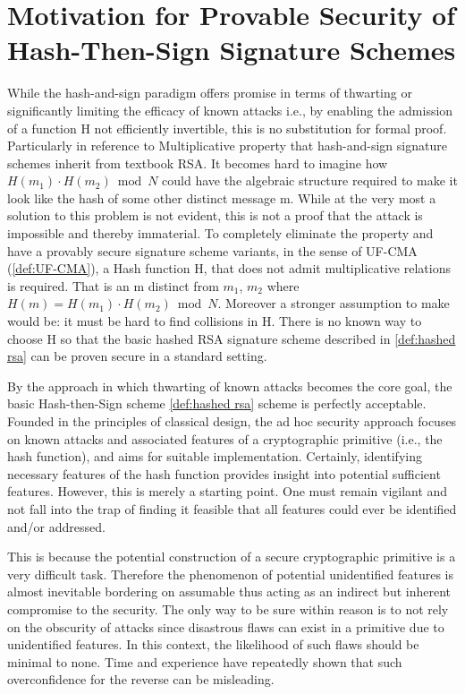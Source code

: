 \documentclass[]{final_report}
\theoremstyle{definition}
\begin{document}
\section{Motivation for Provable Security of Hash-Then-Sign Signature Schemes}
While the hash-and-sign paradigm offers promise in terms of thwarting or significantly limiting the efficacy of known attacks i.e., by enabling the admission of a function H not efficiently invertible, this is no substitution for formal proof. Particularly in reference to Multiplicative property that hash-and-sign signature schemes inherit from textbook RSA. 
It becomes hard to imagine how $H(m_{1}) \cdot H(m_{2}) \bmod N$ could have the algebraic structure required to make it look like the hash of some other distinct message m. While at the very most a solution to this problem is not evident, this is not a proof that the attack is impossible and thereby immaterial. 
To completely eliminate the property and have a provably secure signature scheme variants, in the sense of UF-CMA (\ref{def:UF-CMA}), a Hash function H, that does not admit multiplicative relations is required. That is an m distinct from $m_{1}$, $m_{2}$ where $H(m) = H(m_{1}) \cdot H(m_{2}) \bmod N$. Moreover a stronger assumption to make would be: it must be hard to find collisions in H. There is no known way to choose H so that the basic hashed RSA signature scheme described in \ref{def:hashed rsa} can be proven secure in a standard setting.

By the approach in which thwarting of known attacks becomes the core goal, the basic Hash-then-Sign scheme \ref{def:hashed rsa} scheme is perfectly acceptable. Founded in the principles of classical design, the ad hoc security approach focuses on known attacks and associated features of a cryptographic primitive (i.e., the hash function), and aims for suitable implementation. Certainly, identifying necessary features of the hash function provides insight into potential sufficient features. However, this is merely a starting point. One must remain vigilant and not fall into the trap of finding it feasible that all features could ever be identified and/or addressed. 

This is because the potential construction of a secure cryptographic primitive is a very difficult task. Therefore the phenomenon of potential unidentified features is almost inevitable bordering on assumable thus acting as an indirect but inherent compromise to the security. The only way to be sure within reason is to not rely on the obscurity of attacks since disastrous flaws can exist in a primitive due to unidentified features. In this context, the likelihood of such flaws should be minimal to none. Time and experience have repeatedly shown that such overconfidence for the reverse can be misleading.
\end{document}
